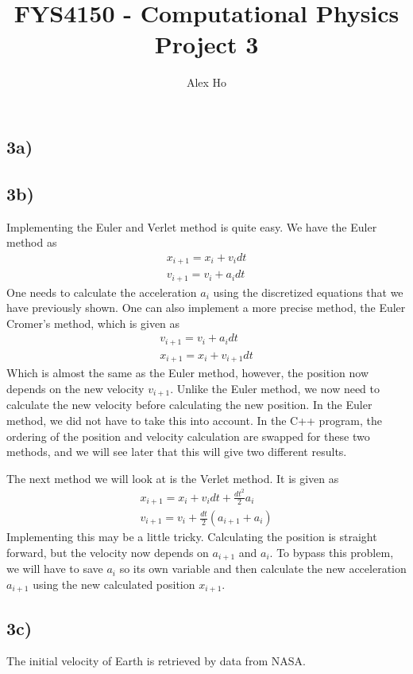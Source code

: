 \documentclass[12pt]{article}
\author{Alex Ho}
\title{FYS4150 - Computational Physics \\ Project 3}
\begin{document}
\maketitle
\subsection*{3a)}
\subsection*{3b)}
Implementing the Euler and Verlet method is quite easy. We have the Euler method as
\begin{align*}
x_{i+1} = x_i + v_idt \\
v_{i+1} = v_i + a_idt
\end{align*}
One needs to calculate the acceleration $a_i$ using the discretized equations that we have previously shown. One can also implement a more precise method, the Euler Cromer's method, which is given as
\begin{align*}
v_{i+1} = v_i + a_idt \\
x_{i+1} = x_i + v_{i+1}dt
\end{align*}
Which is almost the same as the Euler method, however, the position now depends on the new velocity $v_{i+1}$. Unlike the Euler method, we now need to calculate the new velocity before calculating the new position. In the Euler method, we did not have to take this into account. In the C++ program, the ordering of the position and velocity calculation are swapped for these two methods, and we will see later that this will give two different results.

The next method we will look at is the Verlet method. It is given as
\begin{align*}
x_{i+1} = x_i + v_idt + \frac{dt^2}{2}a_i\\
v_{i+1} = v_i + \frac{dt}{2}\left(a_{i+1} + a_i \right)
\end{align*}
Implementing this may be a little tricky. Calculating the position is straight forward, but the velocity now depends on $a_{i+1}$ and $a_i$. To bypass this problem, we will have to save $a_i$ so its own variable and then calculate the new acceleration $a_{i+1}$ using the new calculated position $x_{i+1}$. 

\subsection*{3c)}
The initial velocity of Earth is retrieved by data from NASA.
\end{document}
